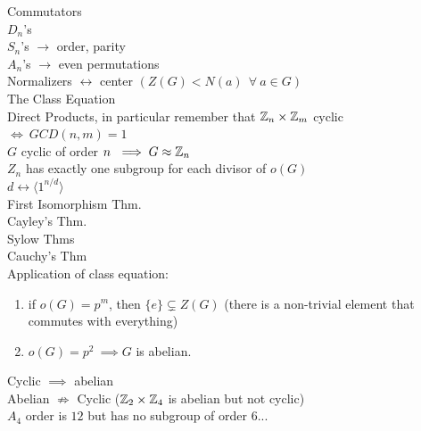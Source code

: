 \noindent Commutators \\

\noindent $D_n$'s \\

\noindent $S_n$'s $\rightarrow$ order, parity \\

\noindent $A_n$'s $\rightarrow$ even permutations \\

\noindent Normalizers $\leftrightarrow$ center $(Z(G)<N(a) \ \ \forall \ a \in G)$ \\

\noindent The Class Equation \\

\noindent Direct Products, in particular remember that ${\mathbb{Z}}_{n}\times {\mathbb{Z}}_{m}$ cyclic $\iff \ GCD(n,m)=1$ \\

\noindent $G$ cyclic of order $n \ \implies G\approx {\mathbb{Z}}_n$ \\

\noindent $Z_n$ has exactly one subgroup for each divisor of $o(G)$ \\

\noindent $d \leftrightarrow \langle 1^{n/d}\rangle$ \\

\noindent First Isomorphism Thm. \\

\noindent Cayley's Thm. \\

\noindent Sylow Thms \\

\noindent Cauchy's Thm \\

\noindent Application of class equation:
\begin{enumerate}
    \item if $o(G)=p^m$, then $\{e\} \subsetneq Z(G)$ (there is a non-trivial element that commutes
    with everything)
    \item $o(G)=p^2 \ \implies G$ is abelian.
\end{enumerate}
\noindent Cyclic $\implies$ abelian\\

\noindent Abelian $\not \Rightarrow$ Cyclic  (${\mathbb{Z}}_2\times {\mathbb{Z}}_4$ is abelian but not cyclic)\\

\noindent $A_4$ order is $12$ but has no subgroup of order $6$...


